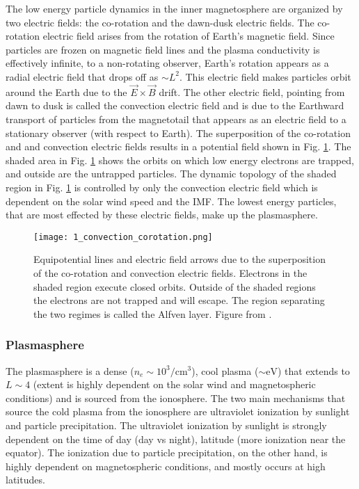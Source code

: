The low energy particle dynamics in the inner magnetosphere are organized by two electric fields: the co-rotation and the dawn-dusk electric fields. The co-rotation electric field arises from the rotation of Earth's magnetic field. Since particles are frozen on magnetic field lines and the plasma conductivity is effectively infinite, to a non-rotating observer, Earth's rotation appears as a radial electric field that drops off as $\sim L^2$. This electric field makes particles orbit around the Earth due to the $\vec{E} \times \vec{B}$ drift. The other electric field, pointing from dawn to dusk is called the convection electric field and is due to the Earthward transport of particles from the magnetotail that appears as an electric field to a stationary observer (with respect to Earth). The superposition of the co-rotation and and convection electric fields results in a potential field shown in Fig. \ref{Intro:E_fields}. The shaded area in Fig. \ref{Intro:E_fields} shows the orbits on which low energy electrons are trapped, and outside are the untrapped particles. The dynamic topology of the shaded region in Fig. \ref{Intro:E_fields} is controlled by only the convection electric field which is dependent on the solar wind speed and the IMF. The lowest energy particles, that are most effected by these electric fields, make up the plasmasphere.

\begin{figure}
\texttt{[image: 1\_convection\_corotation.png]}
\caption{Equipotential lines and electric field arrows due to the superposition of the co-rotation and convection electric fields. Electrons in the shaded region execute closed orbits. Outside of the shaded regions the electrons are not trapped and will escape. The region separating the two regimes is called the Alfven layer. Figure from \citet{Baumjohann1997}.}
\label{Intro:E_fields}
\end{figure}

\subsubsection{Plasmasphere}
The plasmasphere is a dense ($n_e \sim 10^3/\mathrm{cm}^3$), cool plasma ($\sim \mathrm{eV}$) that extends to $L \sim 4$ (extent is highly dependent on the solar wind and magnetospheric conditions) and is sourced from the ionosphere. The two main mechanisms that source the cold plasma from the ionosphere are ultraviolet ionization by sunlight and particle precipitation. The ultraviolet ionization by sunlight is strongly dependent on the time of day (day vs night), latitude (more ionization near the equator). The ionization due to particle precipitation, on the other hand, is highly dependent on magnetospheric conditions, and mostly occurs at high latitudes.

